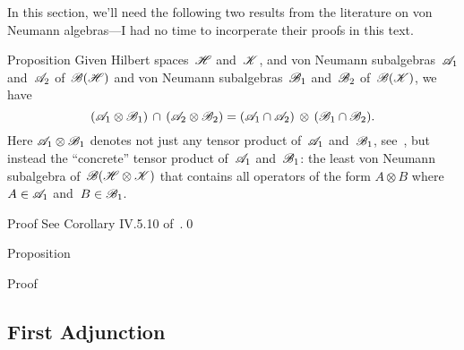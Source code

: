 \documentclass[a]{subfiles}
\begin{document}
\begin{parsec}%
\begin{point}%
In this section,
we'll need the following two results
from the literature on von Neumann algebras---I 
had no time to incorperate their proofs in this text.
\end{point}
\begin{point}{Proposition}%
Given Hilbert spaces~$\mathscr{H}$ and~$\mathscr{K}$,
and von Neumann subalgebras~$\mathscr{A}_1$ and~$\mathscr{A}_2$
of~$\mathscr{B}(\mathscr{H})$
and von Neumann subalgebras~$\mathscr{B}_1$ and~$\mathscr{B}_2$
of~$\mathscr{B}(\mathscr{K})$,
we have 
\begin{equation*}
(\mathscr{A}_1 \otimes  \mathscr{B}_1)\,\cap\,
(\mathscr{A}_2 \otimes \mathscr{B}_2)
= (\mathscr{A}_1\cap\mathscr{A}_2)\,\otimes\,
(\mathscr{B}_1\cap \mathscr{B}_2).
\end{equation*}
Here
$\mathscr{A}_1 \otimes \mathscr{B}_1$
denotes not just any tensor product of~$\mathscr{A}_1$ and~$\mathscr{B}_1$,
see~,
but instead
the ``concrete'' tensor product 
of~$\mathscr{A}_1$ and~$\mathscr{B}_1$:
the least von Neumann subalgebra of~$\mathscr{B}(\mathscr{H}\otimes\mathscr{K})$
that contains all operators
of the form $A\otimes B$ where~$A\in\mathscr{A}_1$
and~$B\in\mathscr{B}_1$.
\begin{point}{Proof}%
See Corollary IV.5.10 of~\cite{Takesaki1}.\qed
\end{point}
\end{point}
\begin{point}{Proposition}%
\begin{point}{Proof}%
\end{point}
\end{point}
\end{parsec}
\subsection{First Adjunction}
\end{document}
